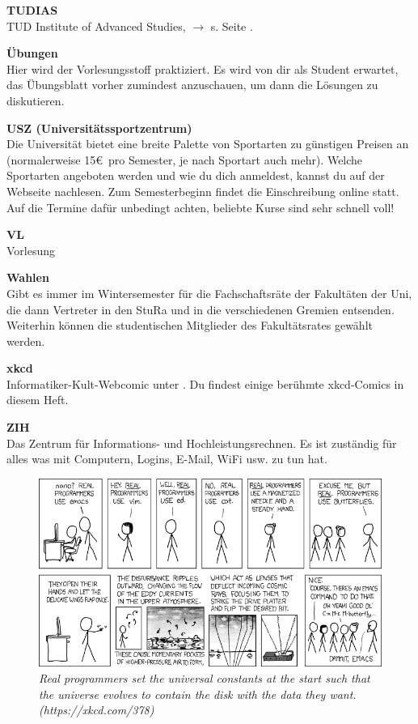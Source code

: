 \begin{multicols}{2}
\textbf{TUDIAS} \\
TUD Institute of Advanced Studies, $\rightarrow$ s. Seite \pageref{sec:sprachausbildung}.

\textbf{Übungen} \\
Hier wird der Vorlesungsstoff praktiziert.
Es wird von dir als Student erwartet, das Übungsblatt vorher zumindest anzuschauen, um dann die Lösungen zu diskutieren.

\textbf{USZ (Universitätssportzentrum)} \\
Die Universität bietet eine breite Palette von Sportarten zu günstigen Preisen an (normalerweise 15\euro\ pro Semester, je nach Sportart auch mehr).
Welche Sportarten angeboten werden und wie du dich anmeldest, kannst du auf der Webseite  nachlesen.
Zum Semesterbeginn findet die Einschreibung online statt.
Auf die Termine dafür unbedingt achten, beliebte Kurse sind sehr schnell voll!

\textbf{VL} \\
Vorlesung

\textbf{Wahlen} \\
Gibt es immer im Wintersemester für die Fachschaftsräte der Fakultäten der Uni, die dann Vertreter in den StuRa und in die verschiedenen Gremien entsenden.
Weiterhin können die studentischen Mitglieder des Fakultätsrates gewählt werden.

\vfill\columnbreak

\textbf{xkcd} \\
Informatiker-Kult-Webcomic unter . Du findest einige berühmte xkcd-Comics in diesem Heft.

\textbf{ZIH} \\
Das Zentrum für Informations- und Hochleistungsrechnen.
Es ist zuständig für alles was mit Computern, Logins, E-Mail, WiFi usw. zu tun hat.

\end{multicols}

\vfill
\begin{figure}[h!]
\centering
\includegraphics[width=\linewidth]{img/xkcd/real_programmers.png}
\caption*{{\small \textit{Real programmers set the universal constants at the start such that the universe evolves to contain the disk with the data they want. (https://xkcd.com/378)}}}
\end{figure}

